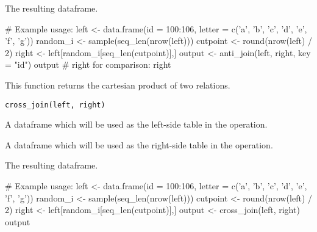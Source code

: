 \documentclass[a4paper]{book}
\begin{document}
%
\begin{Value}
\begin{ldescription}
\item[\code{rtn}] The resulting dataframe.
\end{ldescription}
\end{Value}
%
\begin{Examples}
\begin{ExampleCode}
    # Example usage:
    left <- data.frame(id = 100:106, letter = c('a', 'b', 'c', 'd', 'e', 'f', 'g'))
    random_i <- sample(seq_len(nrow(left)))
    cutpoint <- round(nrow(left) / 2)
    right <- left[random_i[seq_len(cutpoint)],]
    output <- anti_join(left, right, key = "id")
    output
    # right for comparison:
    right
\end{ExampleCode}
\end{Examples}
%
\begin{Description}\relax
This function returns the cartesian product of two relations.
\end{Description}
%
\begin{Usage}
\begin{verbatim}
cross_join(left, right)
\end{verbatim}
\end{Usage}
%
\begin{Arguments}
\begin{ldescription}
\item[\code{left}] A dataframe which will be used as the left-side table in the operation.
\item[\code{right}] A dataframe which will be used as the right-side table in the operation.
\end{ldescription}
\end{Arguments}
%
\begin{Value}
\begin{ldescription}
\item[\code{rtn}] The resulting dataframe.
\end{ldescription}
\end{Value}
%
\begin{Examples}
\begin{ExampleCode}
    # Example usage:
    left <- data.frame(id = 100:106, letter = c('a', 'b', 'c', 'd', 'e', 'f', 'g'))
    random_i <- sample(seq_len(nrow(left)))
    cutpoint <- round(nrow(left) / 2)
    right <- left[random_i[seq_len(cutpoint)],]
    output <- cross_join(left, right)
    output
\end{ExampleCode}
\end{Examples}
\end{document}
